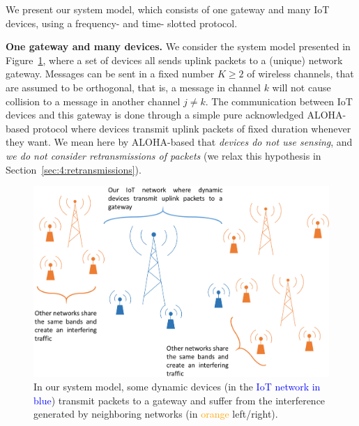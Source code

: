 We present our system model, which consists of one gateway and many IoT devices, using a frequency- and time- slotted protocol.

\textbf{One gateway and many devices.}
%
We consider the system model presented in Figure~\ref{fig:41:system_model1}, where a set of devices all sends uplink packets to a (unique) network gateway.
Messages can be sent in a fixed number $K\geq2$ of wireless channels,
that are assumed to be orthogonal, that is, a message in channel $k$ will not cause collision to a message in another channel $j \neq k$.
The communication between IoT devices and this gateway is done through a simple pure acknowledged ALOHA-based protocol where devices transmit uplink packets of fixed duration whenever they want.
We mean here by ALOHA-based that \emph{devices do not use sensing}, and \emph{we do not consider retransmissions of packets} (we relax this hypothesis in Section~\ref{sec:4:retransmissions}).
%

\begin{figure}[!h]
    \centering
    \includegraphics[width=0.70\linewidth]{system_model1.eps}
    \caption[In our system model, some dynamic devices (in the IoT network) transmit packets to a gateway and suffer from the interference generated by neighboring networks.]{In our system model, some dynamic devices (in the \textcolor{blue}{IoT network in blue}) transmit packets to a gateway and suffer from the interference generated by neighboring networks (in \textcolor{orange}{orange} left/right).}
    \label{fig:41:system_model1}
\end{figure}

